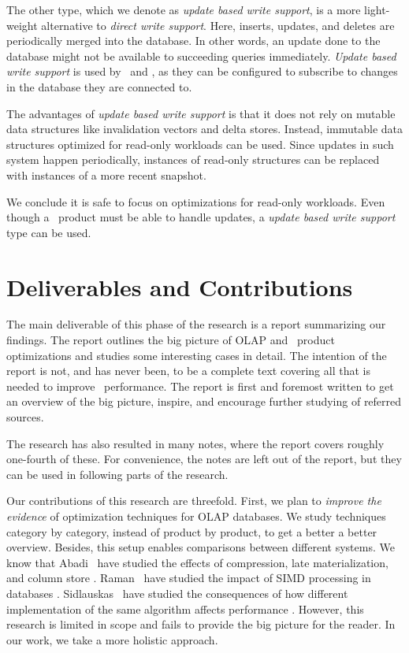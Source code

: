 The other type, which we denote as \textit{update based write support}, is a more light-weight alternative to \textit{direct write support}. Here, inserts, updates, and deletes are periodically merged into the database. In other words, an update done to the database might not be available to succeeding queries immediately. \textit{Update based write support} is used by \qlikview~and \tableau, as they can be configured to subscribe to changes in the database they are connected to.

The advantages of \textit{update based write support} is that it does not rely on mutable data structures like invalidation vectors and delta stores. Instead, immutable data structures optimized for read-only workloads can be used. Since updates in such system happen periodically, instances of read-only structures can be replaced with instances of a more recent snapshot.

We conclude it is safe to focus on optimizations for read-only workloads. Even though a \bd~product must be able to handle updates, a \textit{update based write support} type can be used.



\section{Deliverables and Contributions}
\label{sec:Deliverables and Contributions}

The main deliverable of this phase of the research is a report summarizing our findings. The report outlines the big picture of OLAP and \bd~product optimizations and studies some interesting cases in detail. The intention of the report is not, and has never been, to be a complete text covering all that is needed to improve \bd~performance. The report is first and foremost written to get an overview of the big picture, inspire, and encourage further studying of referred sources. 

The research has also resulted in many notes, where the report covers roughly one-fourth of these. For convenience, the notes are left out of the report, but they can be used in following parts of the research.

Our contributions of this research are threefold. First, we plan to \textit{improve the evidence} of optimization techniques for OLAP databases. We study techniques category by category, instead of product by product, to get a better a better overview. Besides, this setup enables comparisons between different systems. We know that Abadi \ea~have studied the effects of compression, late materialization, and column store \cite{Abadi2008-dd}. Raman \ea~have studied the impact of SIMD processing in databases \cite{Raman2008-gi}. Sidlauskas \ea~have studied the consequences of how different implementation of the same algorithm affects performance \cite{Sidlauskas2014-ef}. However, this research is limited in scope and fails to provide the big picture for the reader. In our work, we take a more holistic approach.

